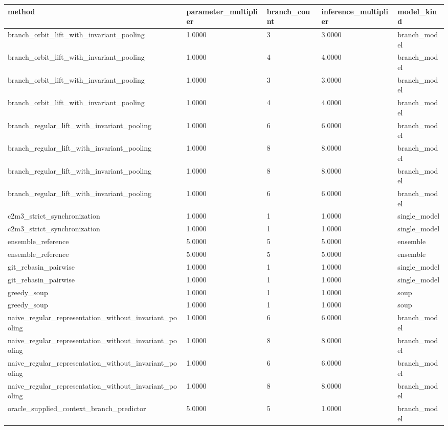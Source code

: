 \begin{tabular}{lllll}
\toprule
method & parameter_multiplier & branch_count & inference_multiplier & model_kind\\
\midrule
branch\_orbit\_lift\_with\_invariant\_pooling & 1.0000 & 3 & 3.0000 & branch\_model\\
branch\_orbit\_lift\_with\_invariant\_pooling & 1.0000 & 4 & 4.0000 & branch\_model\\
branch\_orbit\_lift\_with\_invariant\_pooling & 1.0000 & 3 & 3.0000 & branch\_model\\
branch\_orbit\_lift\_with\_invariant\_pooling & 1.0000 & 4 & 4.0000 & branch\_model\\
branch\_regular\_lift\_with\_invariant\_pooling & 1.0000 & 6 & 6.0000 & branch\_model\\
branch\_regular\_lift\_with\_invariant\_pooling & 1.0000 & 8 & 8.0000 & branch\_model\\
branch\_regular\_lift\_with\_invariant\_pooling & 1.0000 & 8 & 8.0000 & branch\_model\\
branch\_regular\_lift\_with\_invariant\_pooling & 1.0000 & 6 & 6.0000 & branch\_model\\
c2m3\_strict\_synchronization & 1.0000 & 1 & 1.0000 & single\_model\\
c2m3\_strict\_synchronization & 1.0000 & 1 & 1.0000 & single\_model\\
ensemble\_reference & 5.0000 & 5 & 5.0000 & ensemble\\
ensemble\_reference & 5.0000 & 5 & 5.0000 & ensemble\\
git\_rebasin\_pairwise & 1.0000 & 1 & 1.0000 & single\_model\\
git\_rebasin\_pairwise & 1.0000 & 1 & 1.0000 & single\_model\\
greedy\_soup & 1.0000 & 1 & 1.0000 & soup\\
greedy\_soup & 1.0000 & 1 & 1.0000 & soup\\
naive\_regular\_representation\_without\_invariant\_pooling & 1.0000 & 6 & 6.0000 & branch\_model\\
naive\_regular\_representation\_without\_invariant\_pooling & 1.0000 & 8 & 8.0000 & branch\_model\\
naive\_regular\_representation\_without\_invariant\_pooling & 1.0000 & 6 & 6.0000 & branch\_model\\
naive\_regular\_representation\_without\_invariant\_pooling & 1.0000 & 8 & 8.0000 & branch\_model\\
oracle\_supplied\_context\_branch\_predictor & 5.0000 & 5 & 1.0000 & branch\_model\\

\end{tabular}
